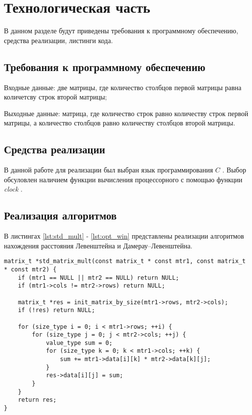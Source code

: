 \chapter{Технологическая часть}

В данном разделе будут приведены требования к программному обеспечению, средства реализации, листинги кода.

\section{Требования к программному обеспечению}

Входные данные: две матрицы, где количество столбцов первой матрицы равна количетсву строк второй матрицы;

Выходные данные: матрица, где количество строк равно количеству строк первой матрицы, а количество столбцов равно количеству столбцов второй матрицы.

\section{Средства реализации}
В данной работе для реализации был выбран язык программирования $C$ \cite{clang}. Выбор обсуловлен наличием функции вычисления процессорного с помощью функции \textit{clock} \cite{clock}.

\section{Реализация алгоритмов}

В листингах \ref{lst:std_mult} - \ref{lst:opt_win} представлены реализации алгоритмов нахождения расстояния Левенштейна и Дамерау–Левенштейна.

\clearpage

\begin{center}
\captionsetup{justification=raggedright,singlelinecheck=off}
\begin{lstlisting}[label=lst:std_mult,caption=Классический алгоритм]
matrix_t *std_matrix_mult(const matrix_t * const mtr1, const matrix_t * const mtr2) {
    if (mtr1 == NULL || mtr2 == NULL) return NULL;
    if (mtr1->cols != mtr2->rows) return NULL;

    matrix_t *res = init_matrix_by_size(mtr1->rows, mtr2->cols);
    if (!res) return NULL;

    for (size_type i = 0; i < mtr1->rows; ++i) {
        for (size_type j = 0; j < mtr2->cols; ++j) {
            value_type sum = 0;
            for (size_type k = 0; k < mtr1->cols; ++k) {
                sum += mtr1->data[i][k] * mtr2->data[k][j];
            }
            res->data[i][j] = sum;
        }
    }
    return res;
}
\end{lstlisting}
\end{center}


